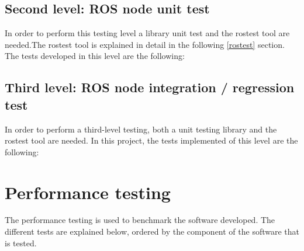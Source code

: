 





	\subsection{Second level: ROS node unit test}
		In order to perform this testing level a library unit test and the rostest tool are needed.The rostest tool is explained in detail in the following \ref{rostest} section.\\

		The tests developed in this level are the following: 

	\subsection{Third level: ROS node integration / regression test}
		In order to perform a third-level testing, both a unit testing library and the rostest tool are needed. In this project, the tests implemented of this level are the following: 


\section{Performance testing}
The performance testing is used to benchmark the software developed. The different tests are explained below, ordered by the component of the software that is tested. 


